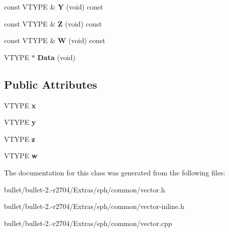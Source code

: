 \begin{DoxyCompactItemize}
\item 
\hypertarget{class_vector4_d_f_acaab03208c8d2e3fb448c4c4eadc287b}{const V\+T\+Y\+P\+E \& {\bfseries Y} (void) const }\label{class_vector4_d_f_acaab03208c8d2e3fb448c4c4eadc287b}

\item 
\hypertarget{class_vector4_d_f_a2f3b0b3dffa56685b5ec817d96620b3e}{const V\+T\+Y\+P\+E \& {\bfseries Z} (void) const }\label{class_vector4_d_f_a2f3b0b3dffa56685b5ec817d96620b3e}

\item 
\hypertarget{class_vector4_d_f_af60d7850744b826fb16900104e715e06}{const V\+T\+Y\+P\+E \& {\bfseries W} (void) const }\label{class_vector4_d_f_af60d7850744b826fb16900104e715e06}

\item 
\hypertarget{class_vector4_d_f_aa1287aa62acdf31d72da3a182b06ce58}{V\+T\+Y\+P\+E $\ast$ {\bfseries Data} (void)}\label{class_vector4_d_f_aa1287aa62acdf31d72da3a182b06ce58}

\end{DoxyCompactItemize}
\subsection*{Public Attributes}
\begin{DoxyCompactItemize}
\item 
\hypertarget{class_vector4_d_f_a12e9c95edecbca80ef0ef616c7a9cf44}{V\+T\+Y\+P\+E {\bfseries x}}\label{class_vector4_d_f_a12e9c95edecbca80ef0ef616c7a9cf44}

\item 
\hypertarget{class_vector4_d_f_a51d8724ec038ff872eda6b4c1d987e9f}{V\+T\+Y\+P\+E {\bfseries y}}\label{class_vector4_d_f_a51d8724ec038ff872eda6b4c1d987e9f}

\item 
\hypertarget{class_vector4_d_f_a44f772d58571877de0715aa417c4004e}{V\+T\+Y\+P\+E {\bfseries z}}\label{class_vector4_d_f_a44f772d58571877de0715aa417c4004e}

\item 
\hypertarget{class_vector4_d_f_af97edf2230ad11f4e7a9045e689c4565}{V\+T\+Y\+P\+E {\bfseries w}}\label{class_vector4_d_f_af97edf2230ad11f4e7a9045e689c4565}

\end{DoxyCompactItemize}


The documentation for this class was generated from the following files\+:\begin{DoxyCompactItemize}
\item 
bullet/bullet-\/2.-\/r2704/\+Extras/sph/common/vector.\+h\item 
bullet/bullet-\/2.-\/r2704/\+Extras/sph/common/vector-\/inline.\+h\item 
bullet/bullet-\/2.-\/r2704/\+Extras/sph/common/vector.\+cpp\end{DoxyCompactItemize}
